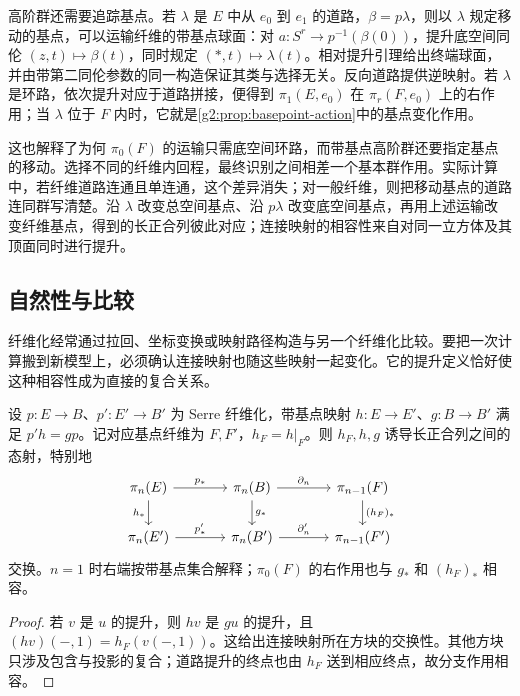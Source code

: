 高阶群还需要追踪基点。若 \(\lambda\) 是 \(E\) 中从 \(e_0\) 到 \(e_1\) 的道路，\(\beta=p\lambda\)，则以 \(\lambda\) 规定移动的基点，可以运输纤维的带基点球面：对 \(a:S^r\to p^{-1}(\beta(0))\)，提升底空间同伦 \((z,t)\mapsto\beta(t)\)，同时规定 \((*,t)\mapsto\lambda(t)\)。相对提升引理给出终端球面，并由带第二同伦参数的同一构造保证其类与选择无关。反向道路提供逆映射。若 \(\lambda\) 是环路，依次提升对应于道路拼接，便得到 \(\pi_1(E,e_0)\) 在 \(\pi_r(F,e_0)\) 上的右作用；当 \(\lambda\) 位于 \(F\) 内时，它就是\cref{g2:prop:basepoint-action}中的基点变化作用。

\ProseParagraphBreak

这也解释了为何 \(\pi_0(F)\) 的运输只需底空间环路，而带基点高阶群还要指定基点的移动。选择不同的纤维内回程，最终识别之间相差一个基本群作用。实际计算中，若纤维道路连通且单连通，这个差异消失；对一般纤维，则把移动基点的道路连同群写清楚。沿 \(\lambda\) 改变总空间基点、沿 \(p\lambda\) 改变底空间基点，再用上述运输改变纤维基点，得到的长正合列彼此对应；连接映射的相容性来自对同一立方体及其顶面同时进行提升。

\subsection{自然性与比较}
\label{g2:subsec:0803:04}

纤维化经常通过拉回、坐标变换或映射路径构造与另一个纤维化比较。要把一次计算搬到新模型上，必须确认连接映射也随这些映射一起变化。它的提升定义恰好使这种相容性成为直接的复合关系。

\begin{proposition}
	\label{g2:prop:fibration-sequence-naturality}
	设 \(p:E\to B\)、\(p':E'\to B'\) 为 Serre 纤维化，带基点映射 \(h:E\to E'\)、\(g:B\to B'\) 满足 \(p'h=gp\)。记对应基点纤维为 \(F,F'\)，\(h_F=h|_F\)。则 \(h_F,h,g\) 诱导长正合列之间的态射，特别地
	\[
		\begin{tikzcd}[column sep=large]
			\pi_n(E)\arrow[r,"p_*"]\arrow[d,"h_*"']&\pi_n(B)\arrow[r,"\partial_n"]\arrow[d,"g_*"]&\pi_{n-1}(F)\arrow[d,"(h_F)_*"]\\
			\pi_n(E')\arrow[r,"p'_*"]&\pi_n(B')\arrow[r,"\partial'_n"]&\pi_{n-1}(F')
		\end{tikzcd}
	\]
	交换。\(n=1\) 时右端按带基点集合解释；\(\pi_0(F)\) 的右作用也与 \(g_*\) 和 \((h_F)_*\) 相容。
\end{proposition}

\begin{proof}
	若 \(v\) 是 \(u\) 的提升，则 \(hv\) 是 \(gu\) 的提升，且 \((hv)(-,1)=h_F(v(-,1))\)。这给出连接映射所在方块的交换性。其他方块只涉及包含与投影的复合；道路提升的终点也由 \(h_F\) 送到相应终点，故分支作用相容。
\end{proof}

